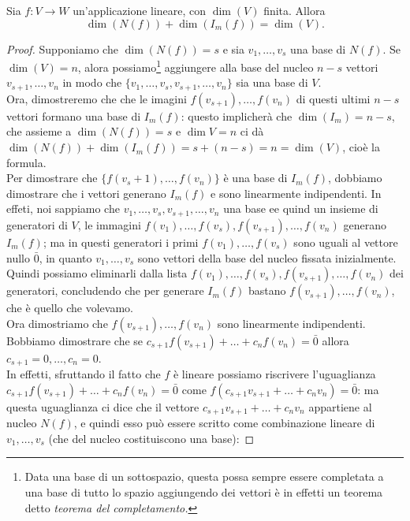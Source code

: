 \begin{teorema}
  Sia $f:V\to W$ un'applicazione lineare, con $\dim (V)$ finita. Allora
  \begin{equation}
    \dim (N(f))+\dim(I_m(f))=\dim(V).
  \end{equation}
\end{teorema}
\begin{proof}
  Supponiamo che $\dim(N(f))=s$ e sia $v_1,\dots,v_s$ una base di $N(f)$. Se $\dim (V)=n$, alora
  possiamo\footnote{Data una base di un sottospazio, questa possa sempre essere completata a una base di tutto
    lo spazio aggiungendo dei vettori è in effetti un teorema detto {\it teorema del completamento.}} aggiungere
  alla base del nucleo $n-s$ vettori $v_{s+1},\dots,v_n$ in modo che $\{v_1,\dots,v_s,v_{s+1},\dots,v_n\}$ sia una
  base di $V$.\\
  Ora, dimostreremo che che le imagini $f(v_{s+1}),\dots,f(v_n)$ di questi ultimi $n-s$ vettori formano una base
  di $I_m(f)$: questo implicherà che $\dim(I_m)=n-s$, che assieme a $\dim(N(f))=s$ e $\dim{V}=n$ ci dà
  $\dim(N(f))+\dim(I_m(f))=s+(n-s)=n=\dim(V)$, cioè la formula. \\
  Per dimostrare che $\{f(v_s+1),\dots,f(v_n)\}$ è una base di $I_m(f)$, dobbiamo dimostrare che i vettori
  generano $I_m(f)$ e sono linearmente indipendenti. In effeti, noi sappiamo che $v_1,\dots,v_s,v_{s+1},\dots,v_n$
  una base ee quind un insieme di generatori di $V$, le immagini $f(v_1),\dots,f(v_s),f(v_{s+1}),\dots,f(v_n)$
  generano $I_m(f)$; ma in questi generatori i primi $f(v_1),\dots,f(v_s)$ sono uguali al vettore nullo $\bar{0}$,
  in quanto $v_1,\dots,v_s$ sono vettori della base del nucleo fissata inizialmente. Quindi possiamo eliminarli
  dalla lista $f(v_1),\dots,f(v_s),f(v_{s+1}),\dots,f(v_n)$ dei generatori, concludendo che per generare $I_m(f)$
  bastano $f(v_{s+1}),\dots,f(v_n)$, che è quello che volevamo.\\
  Ora dimostriamo che $f(v_{s+1}),\dots,f(v_n)$ sono linearmente indipendenti. Bobbiamo dimostrare che se
  $c_{s+1}f(v_{s+1})+\dots+c_nf(v_n)=\bar{0}$ allora $c_{s+1}=0,\dots,c_n=0$.\\
  In effetti, sfruttando il fatto che $f$ è lineare possiamo riscrivere l'uguaglianza
  $c_{s+1}f(v_{s+1})+\dots+c_nf(v_n)=\bar{0}$ come $f(c_{s+1}v_{s+1}+\dots+c_nv_n)=\bar{0}$: ma questa uguaglianza ci
  dice che il vettore $c_{s+1}v_{s+1}+\dots+c_nv_n$ appartiene al nucleo $N(f)$, e quindi esso può essere scritto
  come combinazione lineare di $v_1,\dots,v_s$ (che del nucleo costituiscono una base):

\end{proof}

